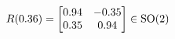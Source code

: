 \documentclass[preview]{standalone}
\begin{document}
\begin{align*}
\special{dvisvgm:raw <g id='unique000'>}R(0.36) = \begin{bmatrix} 0.94 & -0.35 \\ 0.35 & 0.94 \end{bmatrix} \in \text{SO}(2)\special{dvisvgm:raw </g>}
\end{align*}
\end{document}

